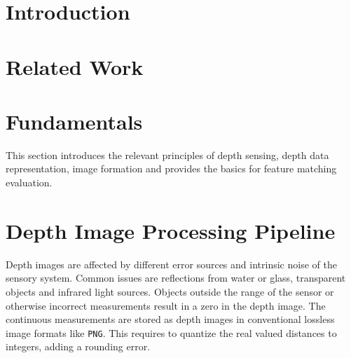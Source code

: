 \documentclass[numbers=noenddot,doktyp=marbeit,fontsize=12pt,sprache=english,hausschrift=true,draft=false]{TUBAFarbeiten}
\begin{document}
\maketitle
\TUBAFErklaerungsseite%

\setcounter{page}{1}

\newpage

\tableofcontents
\newpage



\newpage
{}\listoftables

\newpage
{}\listoffigures

\newpage
{}

\section{Introduction}\label{sec:introduction}

\newpage

\section{Related Work}\label{sec:related_work}

\newpage

\section{Fundamentals}\label{sec:fundamentals}

This section introduces the relevant principles of depth sensing, depth data representation, image formation and provides the basics for feature matching evaluation.






\newpage

\section{Depth Image Processing Pipeline}\label{sec:image_processing}

Depth images are affected by different error sources and intrinsic noise of the sensory system.
Common issues are reflections from water or glass, transparent objects and infrared light sources.
Objects outside the range of the sensor or otherwise incorrect measurements result in a zero in the depth image.
The continuous measurements are stored as depth images in conventional lossless image formats like \texttt{PNG}.
This requires to quantize the real valued distances to integers, adding a rounding error.
\end{document}
